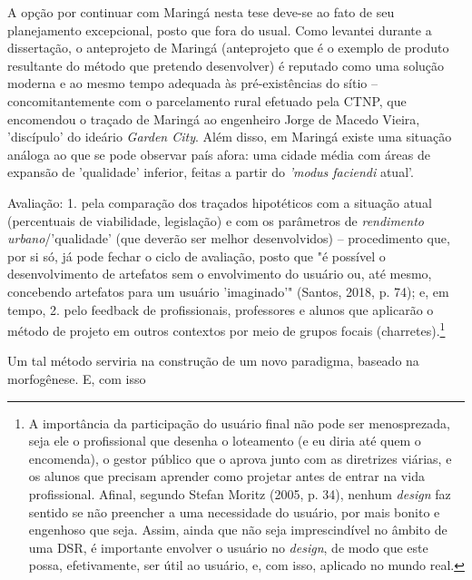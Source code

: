 \documentclass[]{report}
\begin{document}
    A opção por continuar com Maringá nesta tese deve-se ao fato de seu planejamento excepcional, posto que fora do usual. Como levantei durante a dissertação, o anteprojeto de Maringá (anteprojeto que é o exemplo de produto resultante do método que pretendo desenvolver) é reputado como uma solução moderna e ao mesmo tempo adequada às pré-existências do sítio – concomitantemente com o parcelamento rural efetuado pela CTNP, que encomendou o traçado de Maringá ao engenheiro Jorge de Macedo Vieira, 'discípulo' do ideário \textit{Garden City}. Além disso, em Maringá existe uma situação análoga ao que se pode observar país afora: uma cidade média com áreas de expansão de 'qualidade' inferior, feitas a partir do \textit{'modus faciendi} atual'.

    Avaliação: 1. pela comparação dos traçados hipotéticos com a situação atual (percentuais de viabilidade, legislação) e com os parâmetros de \textit{rendimento urbano}/'qualidade' (que deverão ser melhor desenvolvidos) – procedimento que, por si só, já pode fechar o ciclo de avaliação, posto que "é possível o desenvolvimento de artefatos sem o envolvimento do usuário ou, até mesmo, concebendo artefatos para um usuário 'imaginado'" (Santos, 2018, p. 74); e, em tempo, 2. pelo feedback de profissionais, professores e alunos que aplicarão o método de projeto em outros contextos por meio de grupos focais (charretes).\footnote[2]{A importância da participação do usuário final não pode ser menosprezada, seja ele o profissional que desenha o loteamento (e eu diria até quem o encomenda), o gestor público que o aprova junto com as diretrizes viárias, e os alunos que precisam aprender como projetar antes de entrar na vida profissional. Afinal, segundo Stefan Moritz (2005, p. 34), nenhum \textit{design} faz sentido se não preencher a uma necessidade do usuário, por mais bonito e engenhoso que seja. Assim, ainda que não seja imprescindível no âmbito de uma DSR, é importante envolver o usuário no \textit{design}, de modo que este possa, efetivamente, ser útil ao usuário, e, com isso, aplicado no mundo real.} 



    Um tal método serviria na construção de um novo paradigma, baseado na morfogênese. E, com isso




\end{document}

